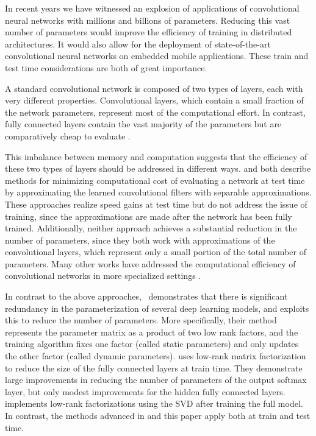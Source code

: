 \documentclass[10pt,twocolumn,letterpaper]{article}
\begin{document}
In recent years we have witnessed an explosion of applications of convolutional neural networks with millions and billions of parameters. Reducing this vast number of parameters would improve the efficiency of training in distributed architectures. It would also allow for the deployment of state-of-the-art convolutional neural networks on embedded mobile applications. These train and test time considerations are both of great importance.

A standard convolutional network is composed of two types of layers, each with
very different properties.  Convolutional layers, which contain a small
fraction of the network parameters, represent most of the computational effort.
In contrast, fully connected layers contain the vast majority of the parameters
but are comparatively cheap to evaluate \cite{Krizhevsky:2014}.

This imbalance between memory and computation suggests that the efficiency of
these two types of layers should be addressed in different ways.
\cite{denton:2014} and \cite{Jaderberg:2014} both describe methods for
minimizing computational cost of evaluating a network at test time by approximating
the learned convolutional filters with separable approximations.  These
approaches realize speed gains at test time but do not address the issue of
training, since the approximations are made after the network has been fully
trained.  Additionally, neither approach achieves a substantial reduction in the number of parameters,
since they both work with approximations of the convolutional layers, which
represent only a small portion of the total number of parameters.  Many other works
have addressed the computational efficiency of convolutional networks in more
specialized settings \cite{farabet2010hardware, HongshengLi2014}.

In contrast to the above approaches,~\cite{DenilSDRF13} demonstrates that there
is significant redundancy in the parameterization of several deep learning
models, and exploits this to reduce the number of parameters. More
specifically, their method represents the parameter matrix as a product of two
low rank factors, and the training algorithm fixes one factor (called static
parameters) and only updates the other factor (called dynamic
parameters). \cite{SainathKSAR13} uses low-rank matrix factorization to reduce the size of the fully connected layers at train time. They demonstrate large improvements in reducing the number of parameters of the output softmax layer, but only modest improvements for the hidden fully connected layers. \cite{XueLG13} implements low-rank factorizations using the SVD after training the full model. In contrast, the methods advanced in \cite{SainathKSAR13} and this paper apply both at train and test time.  
\end{document}
